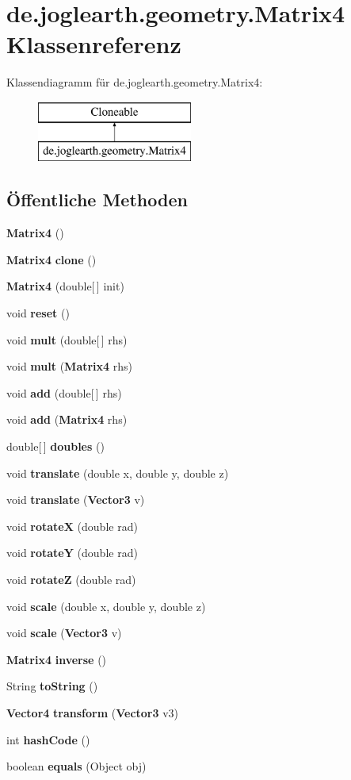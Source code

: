 \section{de.\-joglearth.\-geometry.\-Matrix4 Klassenreferenz}
\label{classde_1_1joglearth_1_1geometry_1_1_matrix4}
Klassendiagramm für de.\-joglearth.\-geometry.\-Matrix4\-:\begin{figure}[H]
\begin{center}
\leavevmode
\includegraphics[height=2.000000cm]{classde_1_1joglearth_1_1geometry_1_1_matrix4}
\end{center}
\end{figure}
\subsection*{Öffentliche Methoden}
\begin{DoxyCompactItemize}
\item 
{\bf Matrix4} ()
\item 
{\bf Matrix4} {\bf clone} ()
\item 
{\bf Matrix4} (double[$\,$] init)
\item 
void {\bf reset} ()
\item 
void {\bf mult} (double[$\,$] rhs)
\item 
void {\bf mult} ({\bf Matrix4} rhs)
\item 
void {\bf add} (double[$\,$] rhs)
\item 
void {\bf add} ({\bf Matrix4} rhs)
\item 
double[$\,$] {\bf doubles} ()
\item 
void {\bf translate} (double x, double y, double z)
\item 
void {\bf translate} ({\bf Vector3} v)
\item 
void {\bf rotate\-X} (double rad)
\item 
void {\bf rotate\-Y} (double rad)
\item 
void {\bf rotate\-Z} (double rad)
\item 
void {\bf scale} (double x, double y, double z)
\item 
void {\bf scale} ({\bf Vector3} v)
\item 
{\bf Matrix4} {\bf inverse} ()
\item 
String {\bf to\-String} ()
\item 
{\bf Vector4} {\bf transform} ({\bf Vector3} v3)
\item 
int {\bfseries hash\-Code} ()\label{classde_1_1joglearth_1_1geometry_1_1_matrix4_a7299aaf8de4c8734194fe0573c5976d2}

\item 
boolean {\bfseries equals} (Object obj)\label{classde_1_1joglearth_1_1geometry_1_1_matrix4_a607b1abe61ca18c63b9a794fb95f1207}

\end{DoxyCompactItemize}


